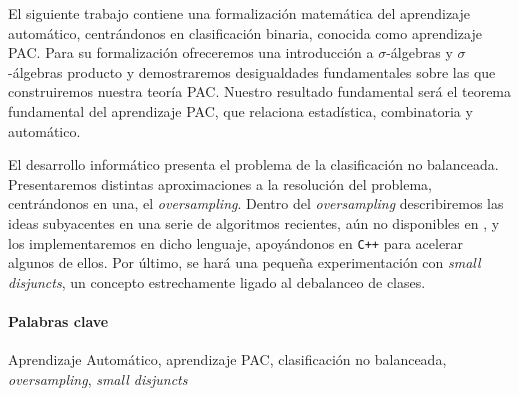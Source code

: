 El siguiente trabajo contiene una formalización matemática del aprendizaje automático, centrándonos en clasificación binaria,
conocida como aprendizaje PAC. Para su formalización ofreceremos una introducción a $\sigma$-álgebras y $\sigma$-álgebras producto y demostraremos desigualdades
fundamentales sobre las que construiremos nuestra teoría PAC. Nuestro resultado fundamental será el teorema fundamental del
aprendizaje PAC, que relaciona estadística, combinatoria y automático.

El desarrollo informático presenta el problema de la clasificación no balanceada. Presentaremos distintas aproximaciones 
a la resolución del problema, centrándonos en una, el \textit{oversampling}. Dentro del \textit{oversampling} describiremos
las ideas subyacentes en una serie de algoritmos recientes, aún no disponibles en \R, y los implementaremos en dicho 
lenguaje, apoyándonos en \texttt{C++} para acelerar algunos de ellos. Por último, se hará una pequeña experimentación
con \textit{small disjuncts}, un concepto estrechamente ligado al debalanceo de clases.

\paragraph{Palabras clave}
Aprendizaje Automático, aprendizaje PAC, clasificación no balanceada, \textit{oversampling}, \textit{small disjuncts}